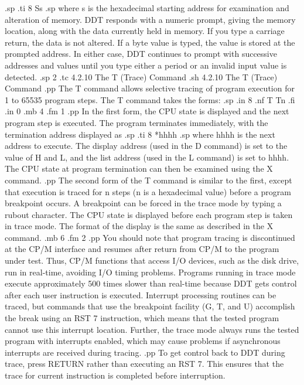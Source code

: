 .sp
.ti 8
Ss
.sp
where s is the hexadecimal starting address for examination and 
alteration of memory.  DDT responds with a numeric prompt, giving 
the memory location, along with the data currently held in 
memory.  If you type a carriage return, the data is 
not altered.  If a byte value is typed, the value is stored at 
the prompted address.  In either case, DDT continues to prompt 
with successive addresses and values until you type either a period 
or an invalid input value is detected.
.sp 2
.tc         4.2.10 The T (Trace) Command
.sh
4.2.10  The T (Trace) Command
.pp
The T command allows selective tracing of program execution for 1 
to 65535 program steps.  The T command takes the forms:
.sp
.in 8
.nf
T
Tn
.fi
.in 0
.mb 4
.fm 1
.pp
In the first form, the CPU state is displayed and the next 
program step is executed.  The program terminates immediately, 
with the termination address displayed as
.sp
.ti 8
*hhhh
.sp
where hhhh is the next address to execute.  The display address 
(used in the D command) is set to the value of H and L, and the 
list address (used in the L command) is set to hhhh.  The CPU 
state at program termination can then be examined using the X 
command.
.pp
The second form of the T command is similar to the first, except 
that execution is traced for n steps (n is a hexadecimal value) 
before a program breakpoint occurs.  A breakpoint can be forced 
in the trace mode by typing a rubout character.  The CPU state is 
displayed before each program step is taken in trace mode.  The 
format of the display is the same as described in the X command.
.mb 6
.fm 2
.pp
You should note that program tracing is discontinued at the 
CP/M interface and resumes after return from CP/M to the program 
under test.  Thus, CP/M functions that access I/O devices, such 
as the disk drive, run in real-time, avoiding I/O timing 
problems.  Programs running in trace mode execute approximately 
500 times slower than real-time because DDT gets control after each 
user instruction is executed.  Interrupt processing routines can 
be traced, but commands that use the breakpoint facility (G, T, 
and U) accomplish the break using an RST 7 instruction, which 
means that the tested program cannot use this interrupt location.  
Further, the trace mode always runs the tested program with 
interrupts enabled, which may cause problems if asynchronous 
interrupts are received during tracing.
.pp
To get control back to DDT during trace, press RETURN rather than 
executing an RST 7.  This ensures that the trace for current 
instruction is completed before interruption.
